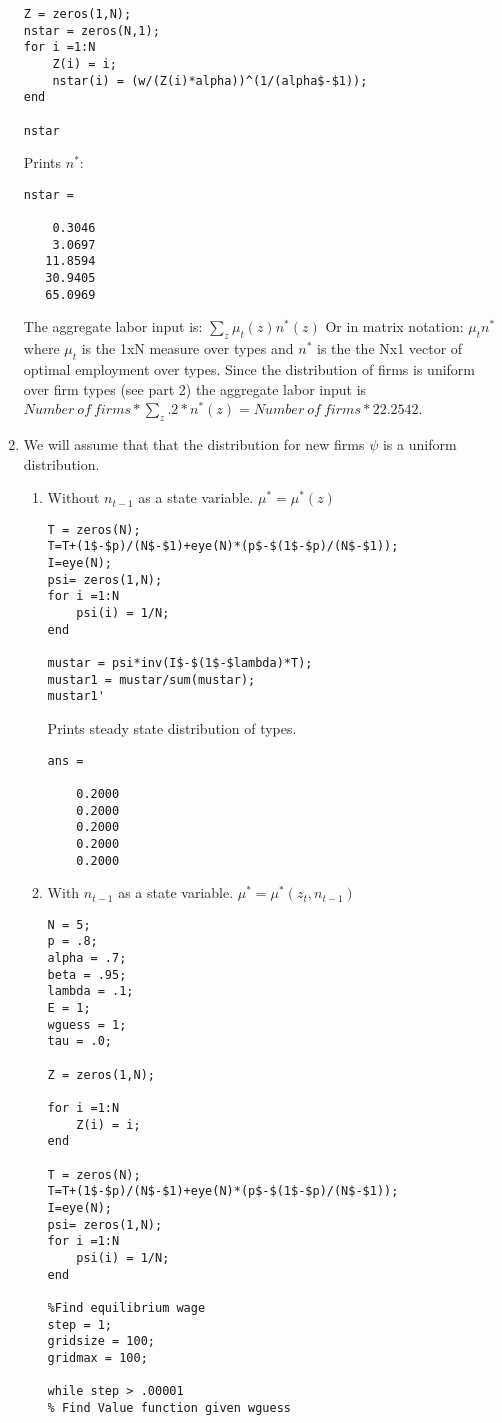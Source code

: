 \documentclass[12pt]{article}
\begin{document}
\begin{onehalfspace}
\begin{enumerate}[1.]
\begin{lstlisting}
Z = zeros(1,N);
nstar = zeros(N,1);
for i =1:N
    Z(i) = i;
    nstar(i) = (w/(Z(i)*alpha))^(1/(alpha$-$1));
end

nstar
    \end{lstlisting}
    Prints $n^*$:
    \begin{lstlisting}
nstar =

    0.3046
    3.0697
   11.8594
   30.9405
   65.0969
    \end{lstlisting}
    The aggregate labor input is:
    $\sum\limits_{z}\mu_t(z) n^*(z)$
    Or in matrix notation: $\mu_t n^*$ where $\mu_t$ is the 1xN measure over types and $n^*$ is the the Nx1 vector of optimal employment over types. Since the distribution of firms is uniform over firm types (see part 2) the aggregate labor input is $Number\ of\ firms*\sum\limits_{z}.2 *n^*(z) = Number\ of\ firms*22.2542$.
    \item
    We will assume that that the distribution for new firms $\psi$ is a uniform distribution.
    \begin{enumerate}
        \item Without $n_{t-1}$ as a state variable. $\mu^*=\mu^*(z)$
        \begin{lstlisting}
T = zeros(N);
T=T+(1$-$p)/(N$-$1)+eye(N)*(p$-$(1$-$p)/(N$-$1));
I=eye(N);
psi= zeros(1,N);
for i =1:N
    psi(i) = 1/N;
end

mustar = psi*inv(I$-$(1$-$lambda)*T);
mustar1 = mustar/sum(mustar);
mustar1'
    \end{lstlisting}
Prints steady state distribution of types.
\begin{lstlisting}
ans =

    0.2000
    0.2000
    0.2000
    0.2000
    0.2000
\end{lstlisting}
        \item With $n_{t-1}$ as a state variable. $\mu^*=\mu^*(z_t, n_{t-1})$
        \begin{lstlisting}
N = 5;
p = .8;
alpha = .7;
beta = .95;
lambda = .1;
E = 1;
wguess = 1;
tau = .0;

Z = zeros(1,N);

for i =1:N
    Z(i) = i;
end

T = zeros(N);
T=T+(1$-$p)/(N$-$1)+eye(N)*(p$-$(1$-$p)/(N$-$1));
I=eye(N);
psi= zeros(1,N);
for i =1:N
    psi(i) = 1/N;
end

%Find equilibrium wage
step = 1;
gridsize = 100;
gridmax = 100;

while step > .00001
% Find Value function given wguess


\end{lstlisting}
\end{enumerate}
\end{enumerate}
\end{onehalfspace}
\end{document}
